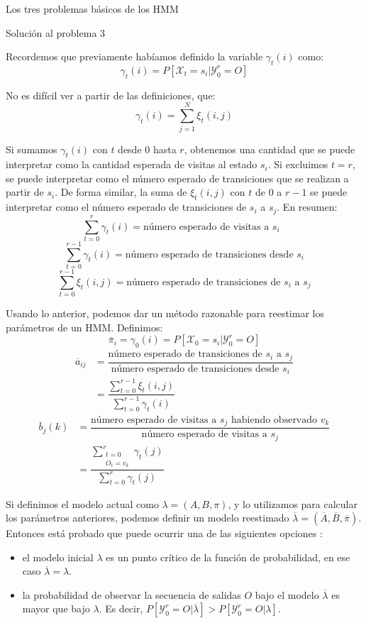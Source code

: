 \begin{section}{Los tres problemas básicos de los HMM}
\begin{subsection}{Solución al problema 3}
\begin{proofs*}
\end{proofs*}


Recordemos que previamente habíamos definido la variable $\gamma_t(i)$ como:
\[\gamma_t(i)=P[\mathcal{X}_t=s_i|\mathcal{Y}_0^r=O]\]

No es difícil ver a partir de las definiciones, que:
\[\gamma_t(i)=\sum_{j=1}^N\xi_t(i,j)\]

Si sumamos $\gamma_t(i)$ con $t$ desde $0$ hasta $r$, obtenemos una cantidad que se puede interpretar como la cantidad esperada de visitas al estado $s_i$. Si excluimos $t=r$, se puede interpretar como el número esperado de transiciones que se realizan a partir de $s_i$. De forma similar, la suma de $\xi_t(i,j)$ con $t$ de $0$ a $r-1$ se puede interpretar como el número esperado de transiciones de $s_i$ a $s_j$. En resumen:
\[\sum_{t=0}^{r}\gamma_t(i)=\text{número esperado de visitas a $s_i$ }\]
\[\sum_{t=0}^{r-1}\gamma_t(i)=\text{número esperado de transiciones desde } s_i\]
\[\sum_{t=0}^{r-1}\xi_t(i,j)=\text{número esperado de transiciones de } s_i \text{ a } s_j\]

Usando lo anterior, podemos dar un método razonable para reestimar los parámetros de un HMM. Definimos:
\[\overline{\pi}_i=\gamma_0(i)=P[\mathcal{X}_0=s_i|\mathcal{Y}_0^r=O]\]
\begin{align*}
    \overline{a}_{ij}&=\dfrac{\text{número esperado de transiciones de $s_i$ a $s_j$}}{\text{número esperado de transiciones desde $s_i$}} \\
    &=\dfrac{\displaystyle\sum_{t=0}^{r-1}\xi_t(i,j)}{\displaystyle\sum_{t=0}^{r-1}\gamma_t(i)}
\end{align*}
\begin{align*}
    \overline{b}_j(k)&=\dfrac{\text{número esperado de visitas a $s_j$ habiendo observado $v_k$}}{\text{número esperado de visitas a $s_j$}}\\
    &=\dfrac{\displaystyle\sum_{\substack{t=0 \\ O_t=v_k}}^{r}\gamma_t(j)}{\displaystyle\sum_{t=0}^{r}\gamma_t(j)}
\end{align*}

Si definimos el modelo actual como $\lambda=(A,B,\pi)$, y lo utilizamos para calcular los parámetros anteriores, podemos definir un modelo reestimado $\overline{\lambda}=(\overline{A},\overline{B},\overline{\pi})$. Entonces está probado que puede ocurrir una de las siguientes opciones \cite{Rabiner}:
\begin{itemize}
    \item el modelo inicial $\lambda$ es un punto crítico de la función de probabilidad, en ese caso $\overline{\lambda}=\lambda$.
    \item la probabilidad de observar la secuencia de salidas $O$ bajo el modelo $\overline{\lambda}$ es mayor que bajo $\lambda$. Es decir, $P[\mathcal{Y}_0^r=O|\overline{\lambda}]>P[\mathcal{Y}_0^r=O|\lambda]$.
\end{itemize}


\end{subsection}
\end{section}
